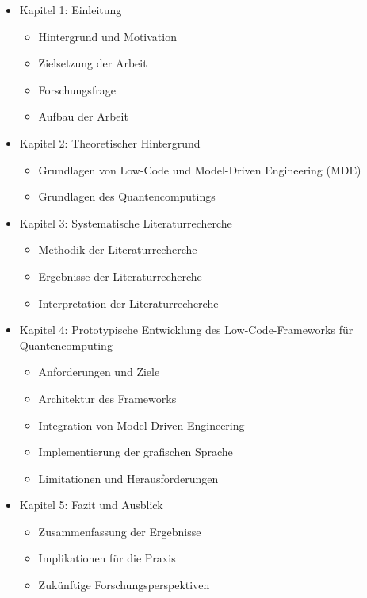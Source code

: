 \begin{itemize}
  \item Kapitel 1: Einleitung
      \begin{itemize}
          \item Hintergrund und Motivation
          \item Zielsetzung der Arbeit
          \item Forschungsfrage
          \item Aufbau der Arbeit
      \end{itemize}
  \item Kapitel 2: Theoretischer Hintergrund
      \begin{itemize}
          \item Grundlagen von Low-Code und Model-Driven Engineering (MDE)
          \item Grundlagen des Quantencomputings
      \end{itemize}
  \item Kapitel 3: Systematische Literaturrecherche
      \begin{itemize}
          \item Methodik der Literaturrecherche
          \item Ergebnisse der Literaturrecherche
          \item Interpretation der Literaturrecherche
      \end{itemize}
  \item Kapitel 4: Prototypische Entwicklung des Low-Code-Frameworks für Quantencomputing
      \begin{itemize}
          \item Anforderungen und Ziele
          \item Architektur des Frameworks
          \item Integration von Model-Driven Engineering
          \item Implementierung der grafischen Sprache
          \item Limitationen und Herausforderungen
      \end{itemize}
  \item Kapitel 5: Fazit und Ausblick
      \begin{itemize}
          \item Zusammenfassung der Ergebnisse
          \item Implikationen für die Praxis
          \item Zukünftige Forschungsperspektiven
      \end{itemize}
\end{itemize}